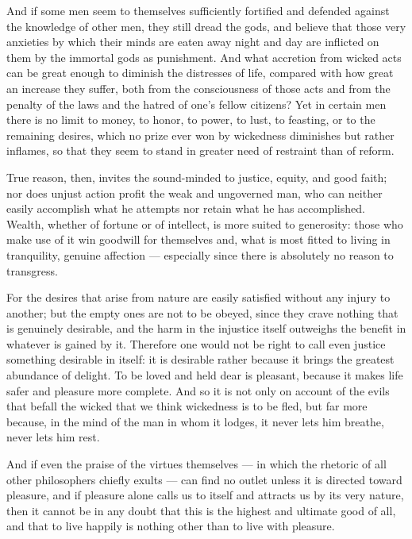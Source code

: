  And if some men seem to themselves sufficiently fortified and defended against the knowledge of other men, they still dread the gods, and believe that those very anxieties by which their minds are eaten away night and day are inflicted on them by the immortal gods as punishment. And what accretion from wicked acts can be great enough to diminish the distresses of life, compared with how great an increase they suffer, both from the consciousness of those acts and from the penalty of the laws and the hatred of one's fellow citizens? Yet in certain men there is no limit to money, to honor, to power, to lust, to feasting, or to the remaining desires, which no prize ever won by wickedness diminishes but rather inflames, so that they seem to stand in greater need of restraint than of reform.

 True reason, then, invites the sound-minded to justice, equity, and good faith; nor does unjust action profit the weak and ungoverned man, who can neither easily accomplish what he attempts nor retain what he has accomplished. Wealth, whether of fortune or of intellect, is more suited to generosity: those who make use of it win goodwill for themselves and, what is most fitted to living in tranquility, genuine affection — especially since there is absolutely no reason to transgress.

 For the desires that arise from nature are easily satisfied without any injury to another; but the empty ones are not to be obeyed, since they crave nothing that is genuinely desirable, and the harm in the injustice itself outweighs the benefit in whatever is gained by it. Therefore one would not be right to call even justice something desirable in itself: it is desirable rather because it brings the greatest abundance of delight. To be loved and held dear is pleasant, because it makes life safer and pleasure more complete. And so it is not only on account of the evils that befall the wicked that we think wickedness is to be fled, but far more because, in the mind of the man in whom it lodges, it never lets him breathe, never lets him rest.

 And if even the praise of the virtues themselves — in which the rhetoric of all other philosophers chiefly exults — can find no outlet unless it is directed toward pleasure, and if pleasure alone calls us to itself and attracts us by its very nature, then it cannot be in any doubt that this is the highest and ultimate good of all, and that to live happily is nothing other than to live with pleasure.

